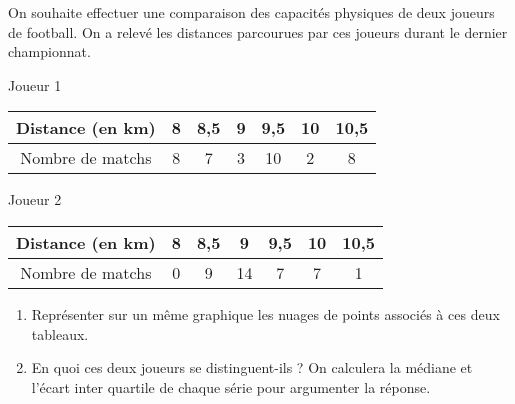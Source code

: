 
On souhaite effectuer une comparaison des capacités physiques de deux joueurs de football. On a relevé les
distances parcourues par ces joueurs durant le dernier championnat.

Joueur 1

\begin{tabular}{|c|c|c|c|c|c|c|}
\hline 
Distance (en km) & 8 & 8,5 & 9 & 9,5 & 10 & 10,5 \\ 
\hline 
Nombre de matchs & 8 & 7 & 3 & 10 & 2& 8\\ 
\hline 
\end{tabular} 

Joueur 2

\begin{tabular}{|c|c|c|c|c|c|c|}
\hline 
Distance (en km)& 8& 8,5& 9 &9,5& 10 & 10,5\\
\hline 
Nombre de matchs&0& 9 &14& 7 &7& 1\\
\hline 
\end{tabular}

\begin{enumerate}
\item Représenter sur un même graphique les nuages de points associés à ces deux tableaux.
\item En quoi ces deux joueurs se distinguent-ils ? On calculera la médiane et l'écart inter quartile de chaque série pour argumenter la réponse.
\end{enumerate}